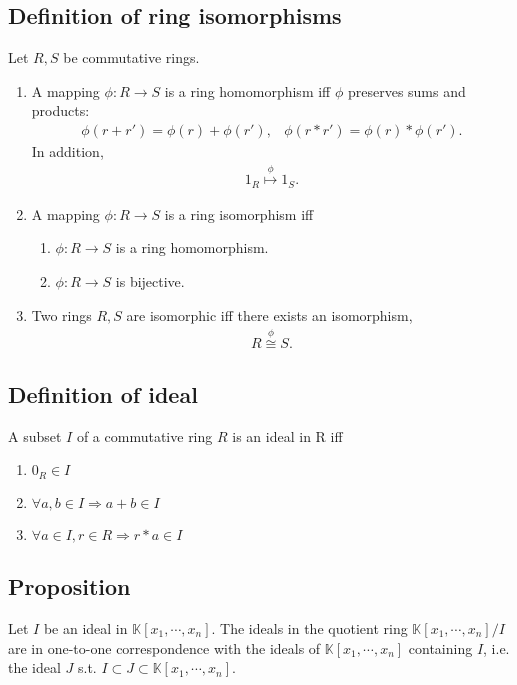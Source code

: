 \documentclass[11pt]{book}
\begin{document}
\subsection{Definition of ring isomorphisms}
Let $R,S$ be commutative rings.
\begin{enumerate}
\item A mapping $\phi: R \to S$ is a ring homomorphism iff $\phi$ preserves sums and products:
\begin{eqnarray}
\phi(r+r') = \phi(r) + \phi(r'), & \phi(r*r') = \phi(r) * \phi(r').
\end{eqnarray}
In addition,
\begin{eqnarray}
1_R \stackrel{\phi}{\mapsto} 1_S.
\end{eqnarray}

\item A mapping $\phi: R \to S$ is a ring isomorphism iff

\begin{enumerate}
\item $\phi: R \to S$ is a ring homomorphism.

\item $\phi: R \to S$ is bijective.

\end{enumerate}

\item Two rings $R,S$ are isomorphic iff there exists an isomorphism,
\begin{eqnarray}
R \stackrel{\phi}{\cong} S.
\end{eqnarray}

\end{enumerate}

\subsection{Definition of ideal}
A subset $I$ of a commutative ring $R$ is an ideal in R iff
\begin{enumerate}
\item $0_R \in I$

\item $\forall a, b \in I \Rightarrow a+b \in I$

\item $\forall a \in I, r \in R \Rightarrow r*a \in I$
\end{enumerate}

\subsection{Proposition}
Let $I$ be an ideal in $\mathbb{K}[x_1, \cdots, x_n]$.
The ideals in the quotient ring $\mathbb{K}[x_1, \cdots, x_n] / I$ are in one-to-one correspondence with the ideals of $\mathbb{K}[x_1, \cdots, x_n]$ containing $I$, i.e. the ideal $J$ s.t. $I \subset J \subset \mathbb{K}[x_1, \cdots, x_n]$.
\end{document}
